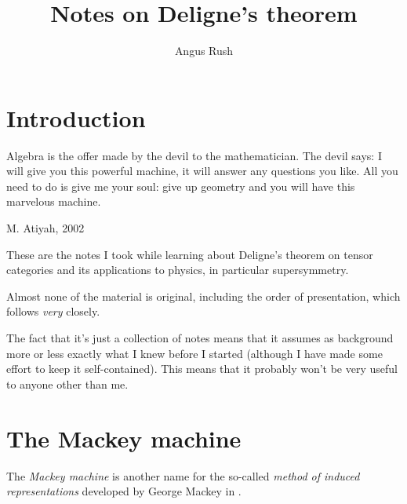 \documentclass[a4paper,10pt]{scrreprt}
\title{Notes on Deligne's theorem}
\author{Angus Rush}
\theoremstyle{definition}
\theoremstyle{plain}
\theoremstyle{remark}
\begin{document}
 
\maketitle
\tableofcontents 

\chapter{Introduction}
\epigraph{Algebra is the offer made by the devil to the mathematician. The devil says: I will give you this powerful machine, it will answer any questions you like. All you need to do is give me your soul: give up geometry and you will have this marvelous machine.}{M. Atiyah, 2002}

These are the notes I took while learning about Deligne's theorem on tensor categories and its applications to physics, in particular supersymmetry. 

Almost none of the material is original, including the order of presentation, which follows \cite{nlab-deligne-theorem} \emph{very} closely.

The fact that it's just a collection of notes means that it assumes as background more or less exactly what I knew before I started (although I have made some effort to keep it self-contained). This means that it probably won't be very useful to anyone other than me.

\chapter{The Mackey machine}
The \emph{Mackey machine} is another name for the so-called \emph{method of induced representations} developed by George Mackey in \cite{mackey-induced-representations}. 
\end{document}

